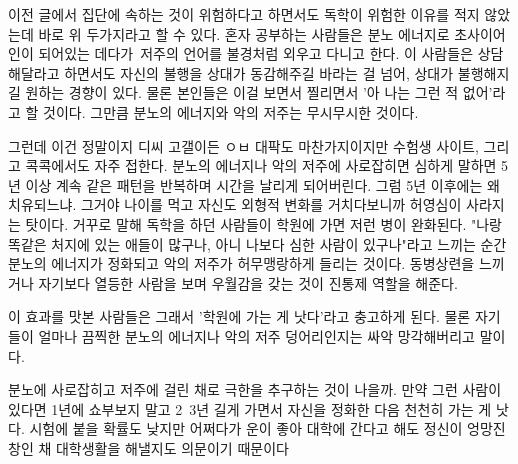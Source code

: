 이전 글에서 집단에 속하는 것이 위험하다고 하면서도 독학이 위험한 이유를 적지 않았는데 바로 위 두가지라고 할 수 있다.
혼자 공부하는 사람들은 분노 에너지로 초사이어인이 되어있는 데다가 저주의 언어를 불경처럼 외우고 다니고 한다.
이 사람들은 상담해달라고 하면서도 자신의 불행을 상대가 동감해주길 바라는 걸 넘어, 상대가 불행해지길 원하는 경향이 있다.
물론 본인들은 이걸 보면서 찔리면서 '아 나는 그런 적 없어'라고 할 것이다.
그만큼 분노의 에너지와 악의 저주는 무시무시한 것이다.
\vspace{5mm}

그런데 이건 정말이지 디씨 고갤이든 ㅇㅂ 대팍도 마찬가지이지만 수험생 사이트, 그리고 콕콕에서도 자주 접한다.
분노의 에너지나 악의 저주에 사로잡히면 심하게 말하면 5년 이상 계속 같은 패턴을 반복하며 시간을 날리게 되어버린다.
그럼 5년 이후에는 왜 치유되느냐. 그거야 나이를 먹고 자신도 외형적 변화를 거치다보니까 허영심이 사라지는 탓이다.
거꾸로 말해 독학을 하던 사람들이 학원에 가면 저런 병이 완화된다.
"나랑 똑같은 처지에 있는 애들이 많구나, 아니 나보다 심한 사람이 있구나"라고 느끼는 순간 분노의 에너지가 정화되고
악의 저주가 허무맹랑하게 들리는 것이다. 동병상련을 느끼거나 자기보다 열등한 사람을 보며 우월감을 갖는 것이 진통제 역할을 해준다.
\vspace{5mm}

이 효과를 맛본 사람들은 그래서 '학원에 가는 게 낫다'라고 충고하게 된다.
물론 자기들이 얼마나 끔찍한 분노의 에너지나 악의 저주 덩어리인지는 싸악 망각해버리고 말이다.
\vspace{5mm}

분노에 사로잡히고 저주에 걸린 채로 극한을 추구하는 것이 나을까.
만약 그런 사람이 있다면 1년에 쇼부보지 말고 2~3년 길게 가면서 자신을 정화한 다음 천천히 가는 게 낫다.
시험에 붙을 확률도 낮지만 어쩌다가 운이 좋아 대학에 간다고 해도 정신이 엉망진창인 채 대학생활을 해낼지도 의문이기 때문이다
\vspace{5mm}



